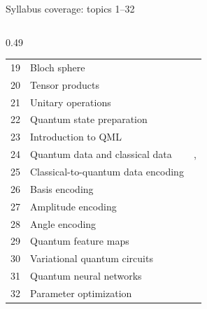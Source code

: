 \documentclass[aspectratio=169,11pt]{beamer}
\begin{document}
\begin{frame}{Syllabus coverage: topics 1--32}
\begin{columns}[T]
\begin{column}{0.49\textwidth}
\begin{tabular}{rlr}
19 & Bloch sphere & \pageref{fBloch} \\
20 & Tensor products & \pageref{fTensor} \\
21 & Unitary operations & \pageref{fGates} \\
22 & Quantum state preparation & \pageref{fPrep} \\
23 & Introduction to QML & \pageref{fQML} \\
24 & Quantum data and classical data & \pageref{fQML}, \pageref{fQData} \\
25 & Classical-to-quantum data encoding & \pageref{fEnc} \\
26 & Basis encoding & \pageref{fBasisAmp} \\
27 & Amplitude encoding & \pageref{fBasisAmp} \\
28 & Angle encoding & \pageref{fAngle} \\
29 & Quantum feature maps & \pageref{fFMap} \\
30 & Variational quantum circuits & \pageref{fAnsatz} \\
31 & Quantum neural networks & \pageref{fQNN} \\
32 & Parameter optimization & \pageref{fOpt} \\
\bottomrule\end{tabular}
    \end{column}
  \end{columns}
\end{frame}
\end{document}
